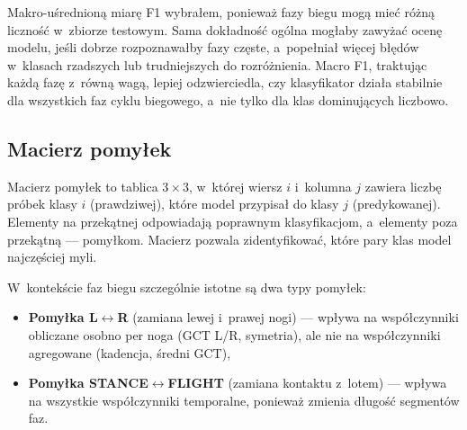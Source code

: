 Makro-uśrednioną miarę F1 wybrałem, ponieważ fazy biegu mogą mieć różną liczność w~zbiorze testowym. Sama dokładność ogólna mogłaby zawyżać ocenę modelu, jeśli dobrze rozpoznawałby fazy częste, a~popełniał więcej błędów w~klasach rzadszych lub trudniejszych do rozróżnienia. Macro F1, traktując każdą fazę z~równą wagą, lepiej odzwierciedla, czy klasyfikator działa stabilnie dla wszystkich faz cyklu biegowego, a~nie tylko dla klas dominujących liczbowo.
\newpage
\subsection{Macierz pomyłek}
\label{sec:metryki-confusion}

Macierz pomyłek to tablica $3 \times 3$, w~której wiersz $i$ i~kolumna $j$ zawiera liczbę próbek klasy $i$ (prawdziwej), które model przypisał do klasy $j$ (predykowanej). Elementy na przekątnej odpowiadają poprawnym klasyfikacjom, a~elementy poza przekątną --- pomyłkom. Macierz pozwala zidentyfikować, które pary klas model najczęściej myli.

W~kontekście faz biegu szczególnie istotne są dwa typy pomyłek:
\begin{itemize}
    \item \textbf{Pomyłka L$\leftrightarrow$R} (zamiana lewej i~prawej nogi) --- wpływa na współczynniki obliczane osobno per noga (GCT L/R, symetria), ale nie na współczynniki agregowane (kadencja, średni GCT),
    \item \textbf{Pomyłka STANCE$\leftrightarrow$FLIGHT} (zamiana kontaktu z~lotem) --- wpływa na wszystkie współczynniki temporalne, ponieważ zmienia długość segmentów faz.
\end{itemize}

